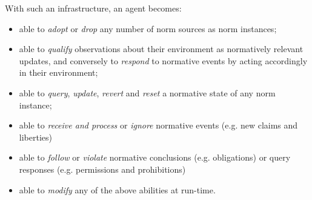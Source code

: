 %
With such an infrastructure, an agent becomes:
\begin{itemize}
    \item able to \textit{adopt} or \textit{drop} any number of norm sources as norm instances;
    \item able to \textit{qualify} observations about their environment as normatively relevant updates, and conversely to \textit{respond} to normative events by acting accordingly in their environment;
    \item able to \textit{query}, \textit{update}, \textit{revert} and \textit{reset} a normative state of any norm instance;
    \item able to \textit{receive and process} or \textit{ignore} normative events (e.g. new claims and liberties) %
    \item able to \textit{follow}
    or \textit{violate} normative conclusions (e.g. obligations) or query responses (e.g. permissions and prohibitions) 
    \item able to \textit{modify} any of the above abilities at run-time.
\end{itemize}

